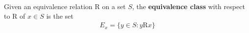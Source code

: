 \begin{definition}
	Given an equivalence relation R on a set $S$, the \textbf{equivalence class} with respect to R of $x\in S$ is the set
	\begin{align*}
		E_x = \{y\in S:y\text{R}x\}
	\end{align*}
\end{definition}







































